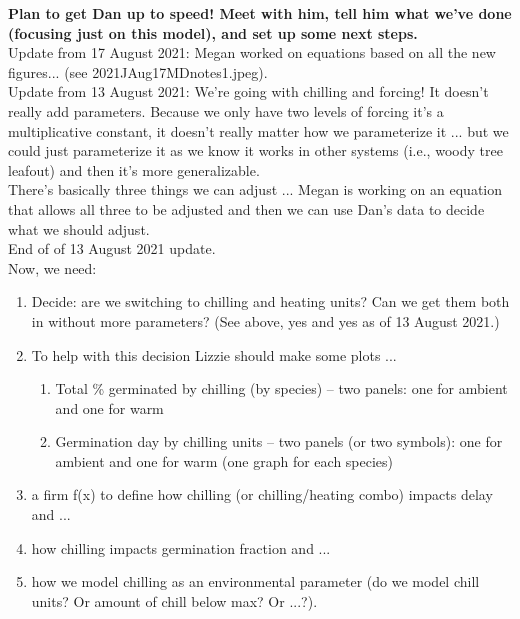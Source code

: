 \documentclass[11pt,letter]{article}
\begin{document}
 {\bf Plan to get Dan up to speed! Meet with him, tell him what we've done (focusing just on this model), and set up some next steps. } \\

Update from 17 August 2021: Megan worked on equations based on all the new figures... (see 2021JAug17MDnotes1.jpeg).\\

Update from 13 August 2021: We're going with chilling and forcing! It doesn't really add parameters. Because we only have two levels of forcing it's a multiplicative constant, it doesn't really matter how we parameterize it ... but we could just parameterize it as we know it works in other systems (i.e., woody tree leafout) and then it's more generalizable. \\

There's basically three things we can adjust ... Megan is working on an equation that allows all three to be adjusted and then we can use Dan's data to decide what we should adjust.\\

End of of 13 August 2021 update.\\

Now, we need:
\begin{enumerate}
\item Decide: are we switching to chilling and heating units? Can we get them both in without more parameters? (See above, yes and yes as of 13 August 2021.)
\item To help with this decision Lizzie should make some plots ... 
\begin{enumerate}
\item Total \% germinated by chilling (by species)  -- two panels: one for ambient and one for warm
\item Germination day by chilling units -- two panels (or two symbols): one for ambient and one for warm (one graph for each species)
\end{enumerate}
\item a firm f(x) to define how chilling (or chilling/heating combo) impacts delay and ...
\item how chilling impacts germination fraction and ...
\item how we model chilling as an environmental parameter (do we model chill units? Or amount of chill below max? Or ...?). 
\end{enumerate}
\end{document}
